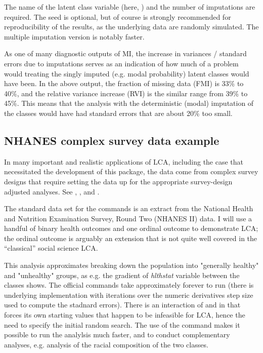 The name of the latent class variable (here, )
and the number of imputations are required. The seed is optional,
but of course is strongly recommended for reproducibility of the results,
as the underlying data are randomly simulated.
The multiple imputation version is notably faster.

As one of many diagnostic outputs of MI, the increase in variances / standard errors
due to imputations serves as an indication of how much of a problem
would treating the singly imputed (e.g. modal probability) latent classes would have been.
In the above output, the fraction of missing data (FMI)
is 33\% to 40\%, and the relative variance increase (RVI) is the similar range 
from 39\% to 45\%. This means that the analysis with the deterministic
(modal) imputation of the classes would have had standard errors 
that are about 20\% too small.

\begin{stlog}
\nullskip
\end{stlog}


\subsection{NHANES complex survey data example}

In many important and realistic applications of LCA, including the case
that necessitated the development of this package, the data come from
complex survey designs that require setting the data up for the appropriate
survey-design adjusted analyses. See , ,
and \citet{kolenikov:pitblado:2014}.

The standard data set for the \svyref{} commands is an extract from 
the National Health and Nutrition Examination Survey, Round Two
(NHANES II) data. I will use a handful of binary health outcomes
and one ordinal outcome to demonstrate LCA; the ordinal outcome
is arguably an extension that is not quite well covered in the
``classical'' social science LCA.

\begin{stlog}
\nullskip
\end{stlog}

This analysis approximates breaking down the population
into "generally healthy" and "unhealthy" groups, as e.g.
the gradient of \textit{hlthstat} variable between the classes
shows. The official  commands
take approximately forever to run (there is underlying
 implementation with iterations over 
the numeric derivatives step size used to compute the stadnard errors).
There is an interaction of  and  in that
 forces its own starting values that happen to be 
infeasible for LCA, hence the need to specify the initial random search.
The use of the  command
makes it possible to run the analylsis much faster,
and to conduct complementary analyses,
e.g. analysis of the racial composition of the two classes.

